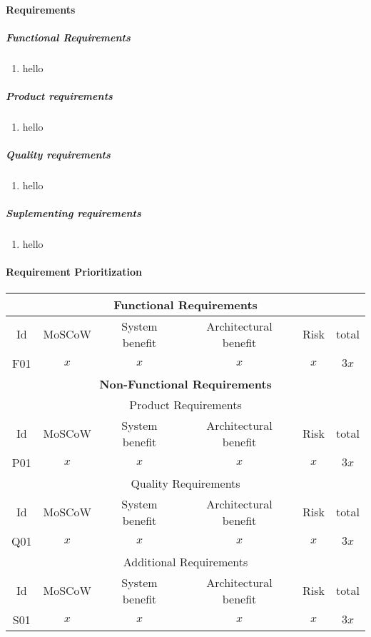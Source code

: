 \documentclass[11pt]{article}
\begin{document}
\paragraph{Requirements}
\subparagraph{Functional Requirements}
\begin{enumerate}[F01]
	\item hello
\end{enumerate}
\subparagraph{Product requirements}
\begin{enumerate}[P01]
	\item hello
\end{enumerate}
\subparagraph{Quality requirements}
\begin{enumerate}[Q01]
	\item hello
\end{enumerate}
\subparagraph{Suplementing requirements}
\begin{enumerate}[S01]
	\item hello
\end{enumerate}


\paragraph{Requirement Prioritization\\[.2cm]}
\begin{tabular}{|c||c||c|c|c||c|}

	\hline \multicolumn{6}{|c|}{\textbf{Functional Requirements}} \\\hline
 	Id  & MoSCoW & System benefit & Architectural benefit & Risk & total\\\hline
 	F01 & $x$ & $x$ & $x$ & $x$ & $3x$ \\\hline
 	
	\multicolumn{6}{|c|}{\textbf{Non-Functional Requirements}} \\\hline
	\multicolumn{6}{|c|}{Product Requirements} \\\hline
 	Id & MoSCoW & System benefit & Architectural benefit & Risk & total\\\hline
 	P01 & $x$ & $x$ & $x$ & $x$ & $3x$ \\\hline
 	
	\multicolumn{6}{|c|}{Quality Requirements} \\\hline
 	Id & MoSCoW & System benefit & Architectural benefit & Risk & total\\\hline
 	Q01 & $x$ & $x$ & $x$ & $x$ & $3x$ \\\hline
 	
	\multicolumn{6}{|c|}{Additional Requirements} \\\hline
 	Id & MoSCoW & System benefit & Architectural benefit & Risk & total\\\hline
 	S01 & $x$ & $x$ & $x$ & $x$ & $3x$ \\\hline
	
\end{tabular}
\end{document}
